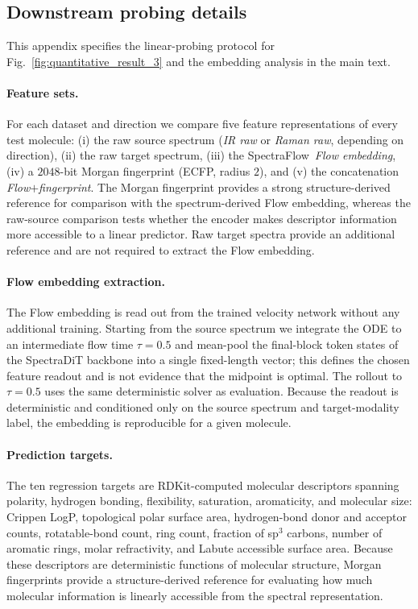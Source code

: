 \documentclass[pdflatex,sn-mathphys-num]{sn-jnl}%
\newcommand{\mname}{SpectraFlow}
\theoremstyle{thmstyleone}%
\theoremstyle{thmstyletwo}%
\theoremstyle{thmstylethree}%
\begin{document}
\begin{appendices}
\section{Downstream probing details}\label{app:downstream}
This appendix specifies the linear-probing protocol for Fig.~\ref{fig:quantitative_result_3} and the embedding analysis in the main text.

\paragraph{Feature sets.} For each dataset and direction we compare five feature representations of every test molecule: (i) the raw source spectrum (\emph{IR raw} or \emph{Raman raw}, depending on direction), (ii) the raw target spectrum, (iii) the \mname\ \emph{Flow embedding}, (iv) a $2048$-bit Morgan fingerprint (ECFP, radius $2$), and (v) the concatenation \emph{Flow$+$fingerprint}. The Morgan fingerprint provides a strong structure-derived reference for comparison with the spectrum-derived Flow embedding, whereas the raw-source comparison tests whether the encoder makes descriptor information more accessible to a linear predictor. Raw target spectra provide an additional reference and are not required to extract the Flow embedding.

\paragraph{Flow embedding extraction.} The Flow embedding is read out from the trained velocity network without any additional training. Starting from the source spectrum we integrate the ODE to an intermediate flow time $\tau=0.5$ and mean-pool the final-block token states of the SpectraDiT backbone into a single fixed-length vector; this defines the chosen feature readout and is not evidence that the midpoint is optimal. The rollout to $\tau{=}0.5$ uses the same deterministic solver as evaluation. Because the readout is deterministic and conditioned only on the source spectrum and target-modality label, the embedding is reproducible for a given molecule.

\paragraph{Prediction targets.} The ten regression targets are RDKit-computed molecular descriptors spanning polarity, hydrogen bonding, flexibility, saturation, aromaticity, and molecular size: Crippen LogP, topological polar surface area, hydrogen-bond donor and acceptor counts, rotatable-bond count, ring count, fraction of sp$^3$ carbons, number of aromatic rings, molar refractivity, and Labute accessible surface area. Because these descriptors are deterministic functions of molecular structure, Morgan fingerprints provide a structure-derived reference for evaluating how much molecular information is linearly accessible from the spectral representation.


\end{appendices}
\end{document}
